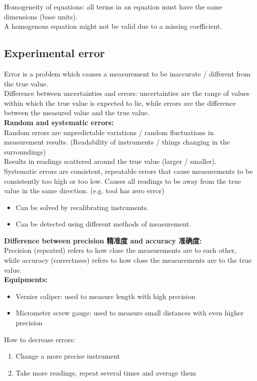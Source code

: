 \documentclass[a4paper,12pt]{article}
\begin{document}
Homogeneity of equations: all terms in an equation must have the same dimensions (base units).\\
A homogenous equation might not be valid due to a missing coefficient.
\subsection{Experimental error}
Error is a problem which causes a measurement to be inaccurate / different from the true value.\\
Difference between uncertainties and errors: uncertainties are the range of values within which the true value is expected to lie, while errors are the difference between the measured value and the true value.\\
\textbf{Random and systematic errors:} \\
Random errors are unpredictable variations / random fluctuations in measurement results. (Readability of instruments / things changing in the surroundings) \\Results in readings scattered around the true value (larger / smaller). \\
Systematic errors are consistent, repeatable errors that cause measurements to be consistently too high or too low. Causes all readings to be away from the true value in the same direction. (e.g. tool has zero error) 
\begin{itemize}
  \item Can be solved by recalibrating instruments.
  \item Can be detected using different methods of measurement.
\end{itemize} 
\textbf{Difference between precision 精准度 and accuracy 准确度:} \\
Precision (repeated) refers to how close the measurements are to each other, while accuracy (correctness) refers to how close the measurements are to the true value.\\
\textbf{Equipments:}
\begin{itemize}
  \item Vernier caliper: used to measure length with high precision
  \item Micrometer screw gauge: used to measure small distances with even higher precision
\end{itemize}
How to decrease errors:
\begin{enumerate}
  \item Change a more precise instrument
  \item Take more readings, repeat several times and average them
\end{enumerate}
\end{document}
